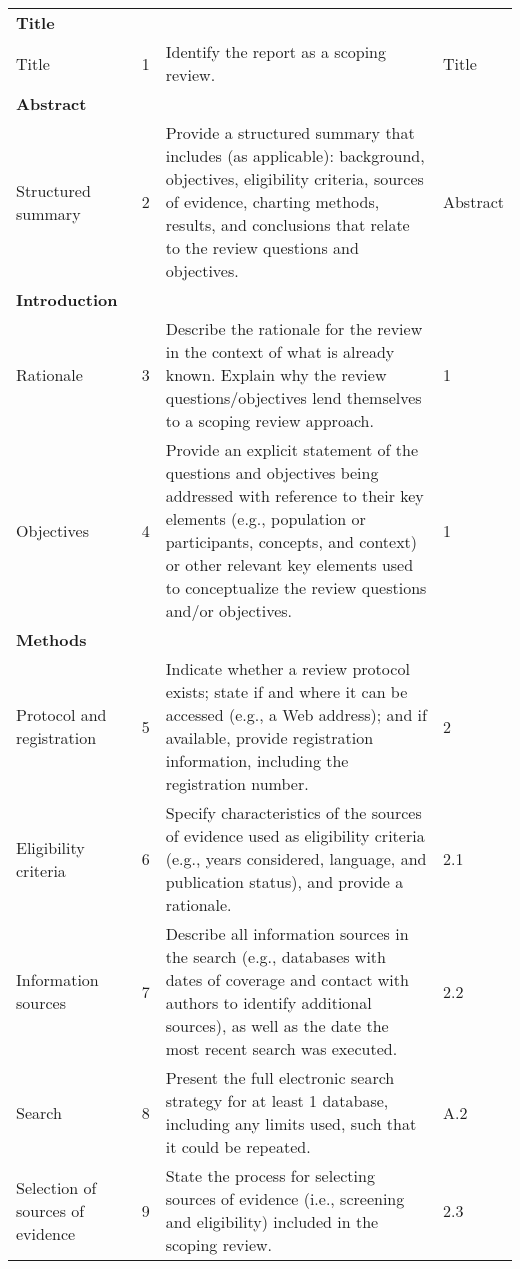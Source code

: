 \begin{longtable}{p{3cm} p{1cm} p{6cm} p{1.5cm}}
\textbf{Title} &  &  & \\
\addlinespace
\hline
\addlinespace
Title & 1 & Identify the report as a scoping review. & Title \\
\addlinespace
\hline
\addlinespace
\textbf{Abstract} &  &  & \\
\addlinespace
\hline
\addlinespace
Structured summary & 2 & Provide a structured summary that includes (as applicable): background, objectives, eligibility criteria, sources of evidence, charting methods, results, and conclusions that relate to the review questions and objectives. & Abstract \\
\addlinespace
\hline
\addlinespace
\textbf{Introduction} &  &  & \\
\addlinespace
\hline
\addlinespace
Rationale & 3 & Describe the rationale for the review in the context of what is already known. Explain why the review questions/objectives lend themselves to a scoping review approach. & 1 \\
\addlinespace
Objectives & 4 & Provide an explicit statement of the questions and objectives being addressed with reference to their key elements (e.g., population or participants, concepts, and context) or other relevant key elements used to conceptualize the review questions and/or objectives. & 1 \\
\addlinespace
\hline
\addlinespace
\textbf{Methods} &  &  & \\
\addlinespace
\hline
\addlinespace
Protocol and registration & 5 & Indicate whether a review protocol exists; state if and where it can be accessed (e.g., a Web address); and if available, provide registration information, including the registration number. & 2 \\
\addlinespace
Eligibility criteria & 6 & Specify characteristics of the sources of evidence used as eligibility criteria (e.g., years considered, language, and publication status), and provide a rationale. & 2.1 \\
\addlinespace
Information sources & 7 & Describe all information sources in the search (e.g., databases with dates of coverage and contact with authors to identify additional sources), as well as the date the most recent search was executed. & 2.2 \\
\addlinespace
Search & 8 & Present the full electronic search strategy for at least 1 database, including any limits used, such that it could be repeated. & A.2 \\
\addlinespace
Selection of sources of evidence & 9 & State the process for selecting sources of evidence (i.e., screening and eligibility) included in the scoping review. & 2.3 \\

\end{longtable}
